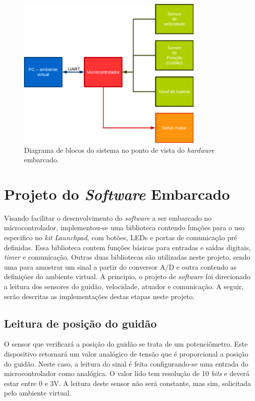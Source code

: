 \begin{figure}[h]
  \centering
  \includegraphics[width=0.8\textwidth]
      {figuras/diag_blocos_elet1.png}
  \caption{Diagrama de blocos do sistema no ponto de vista do \textit{hardware} embarcado.}
  \label{blocos}
\end{figure}

\section{Projeto do \textit{Software} Embarcado} %
\label{sec:soft_emb}
Visando facilitar o desenvolvimento do \textit{software} a ser embarcado no microcontrolador, implementou-se uma biblioteca contendo funções para o uso especifico no \textit{kit} \textit{Launchpad}, com botões, LEDs e portas de comunicação pré definidas. Essa biblioteca contem funções básicas para entradas e saídas digitais, \textit{timer} e comunicação. Outras duas bibliotecas são utilizadas neste projeto, sendo uma para amostrar um sinal a partir do conversor A/D e outra contendo as definições do ambiente virtual.
A principio, o projeto de \textit{software} foi direcionado a leitura dos sensores do guidão, velocidade, atuador e comunicação. A seguir, serão descritas as implementações destas etapas neste projeto.

\subsection{Leitura de posição do guidão} %
\label{sub:read_guid_sens}
O sensor que verificará a posição do guidão se trata de um potenciômetro. Este dispositivo retornará um valor analógico de tensão que é proporcional a posição do guidão. Neste caso, a leitura do sinal é feita configurando-se uma entrada do microcontrolador como analógica. O valor lido tem resolução de 10 \textit{bits} e deverá estar entre 0 e 3V. A leitura deste sensor não será constante, mas sim, solicitada pelo ambiente virtual.

